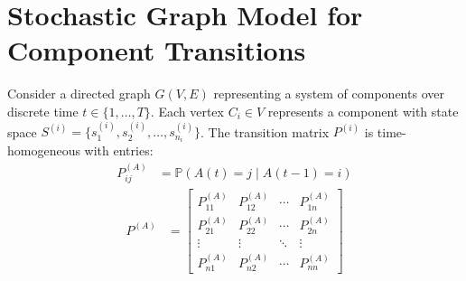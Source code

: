 \documentclass[answers,12pt,addpoints]{exam}
\begin{document}


\section{Stochastic Graph Model for Component Transitions}

Consider a directed graph $G(V, E)$ representing a system of components over discrete time $t \in \{1, \dots, T\}$. Each vertex $C_i \in V$ represents a component with state space $S^{(i)} = \{s^{(i)}_1, s^{(i)}_2, \ldots, s^{(i)}_{n_i}\}$. The transition matrix $P^{(i)}$ is time-homogeneous with entries:
\begin{align*}
P^{(A)}_{ij} &= \mathbb{P}(A(t) = j \mid A(t-1)= i)
\end{align*}
\begin{align*}
    P^{(A)} &= \begin{bmatrix}
    P^{(A)}_{11} & P^{(A)}_{12} & \cdots & P^{(A)}_{1n} \\
    P^{(A)}_{21} & P^{(A)}_{22} & \cdots & P^{(A)}_{2n} \\
    \vdots & \vdots & \ddots & \vdots \\
    P^{(A)}_{n1} & P^{(A)}_{n2} & \cdots & P^{(A)}_{nn}
    \end{bmatrix}
\end{align*}
\end{document}
